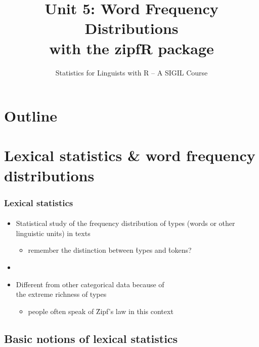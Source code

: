 \documentclass[t]{beamer} %
\title[5.\ WFD \& zipfR]{Unit 5: Word Frequency Distributions\\ 
  with the zipfR package}
\subtitle{Statistics for Linguists with R -- A SIGIL Course}
\begin{document}
\frame{\titlepage}


\section*{Outline}

\section{Lexical statistics \& word frequency distributions}

\begin{frame}
  \frametitle{Lexical statistics}
  \framesubtitle{\citet{Zipf:49,Zipf:65,Baayen:01,Baroni:08}}

  \begin{itemize}
  \item Statistical study of the frequency distribution of \h{types} (words or
    other linguistic units) in texts
    \begin{itemize}
    \item remember the distinction between \h{types} and \h{tokens}?
    \end{itemize}
  \item[]
  \item Different from other categorical data because of\\
    the extreme richness of types
    \begin{itemize}
    \item people often speak of \h{Zipf's law} in this context
    \end{itemize}
  \end{itemize}
\end{frame} 

\subsection{Basic notions of lexical statistics}
\end{document}
